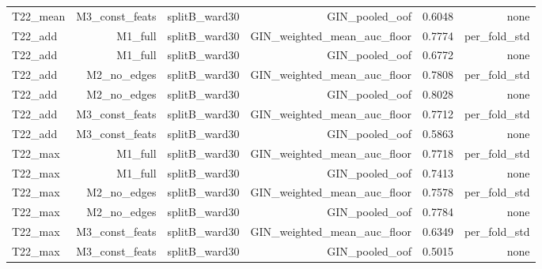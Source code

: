 \begin{table}[ht]
\begin{tabular}{lrrrrr}
T22\_mean & M3\_const\_feats & splitB\_ward30 & GIN\_pooled\_oof & 0.6048 & none \\
T22\_add & M1\_full & splitB\_ward30 & GIN\_weighted\_mean\_auc\_floor & 0.7774 & per\_fold\_std \\
T22\_add & M1\_full & splitB\_ward30 & GIN\_pooled\_oof & 0.6772 & none \\
T22\_add & M2\_no\_edges & splitB\_ward30 & GIN\_weighted\_mean\_auc\_floor & 0.7808 & per\_fold\_std \\
T22\_add & M2\_no\_edges & splitB\_ward30 & GIN\_pooled\_oof & 0.8028 & none \\
T22\_add & M3\_const\_feats & splitB\_ward30 & GIN\_weighted\_mean\_auc\_floor & 0.7712 & per\_fold\_std \\
T22\_add & M3\_const\_feats & splitB\_ward30 & GIN\_pooled\_oof & 0.5863 & none \\
T22\_max & M1\_full & splitB\_ward30 & GIN\_weighted\_mean\_auc\_floor & 0.7718 & per\_fold\_std \\
T22\_max & M1\_full & splitB\_ward30 & GIN\_pooled\_oof & 0.7413 & none \\
T22\_max & M2\_no\_edges & splitB\_ward30 & GIN\_weighted\_mean\_auc\_floor & 0.7578 & per\_fold\_std \\
T22\_max & M2\_no\_edges & splitB\_ward30 & GIN\_pooled\_oof & 0.7784 & none \\
T22\_max & M3\_const\_feats & splitB\_ward30 & GIN\_weighted\_mean\_auc\_floor & 0.6349 & per\_fold\_std \\
T22\_max & M3\_const\_feats & splitB\_ward30 & GIN\_pooled\_oof & 0.5015 & none \\
\bottomrule
\end{tabular}
\end{table}
